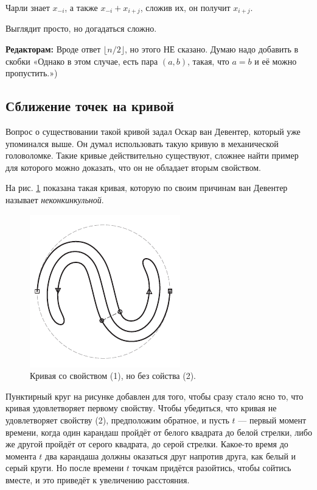 Чарли знает $x_{-i}$, а также $x_{-i} + x_{i+j}$, сложив их, он получит $x_{i+j}$.

Выглядит просто, но догадаться сложно.

\begin{addedbytheeditors}
\textbf{Редакторам:} Вроде ответ $\lfloor n/2\rfloor$, но этого НЕ сказано.
Думаю надо добавить в скобки «Однако в этом случае, есть пара $(a,b)$, такая, что $a=b$ и её можно пропустить.»)
\end{addedbytheeditors}

\subsection*{Сближение точек на кривой}

Вопрос о существовании такой кривой задал Оскар ван Девентер, который уже упоминался выше.
Он думал использовать такую кривую в механической головоломке.
Такие кривые действительно существуют, сложнее найти пример для которого можно доказать, что он не обладает вторым свойством.

На рис. \ref{pic:ss-curve} показана такая кривая, которую по своим причинам ван Девентер называет \emph{неконкинкульной}.

\begin{figure}[htb!]
\centering
\includegraphics[scale=1]{pics/ss-curve}
\caption{Кривая со свойством (1), но без сойства (2).}
\label{pic:ss-curve}
\end{figure}

Пунктирный круг на рисунке добавлен для того, чтобы сразу стало ясно то, что кривая удовлетворяет первому свойству.
Чтобы убедиться, что кривая не удовлетворяет свойству (2),
предположим обратное, и пусть $t$ --- первый момент времени, когда один карандаш пройдёт от белого квадрата до белой стрелки,
либо же другой пройдёт от серого квадрата, до серой стрелки.
Какое-то время до момента $t$ два карандаша должны оказаться друг напротив друга, как белый и серый круги.
Но после времени $t$ точкам придётся разойтись, чтобы сойтись вместе, и это приведёт к увеличению расстояния.

